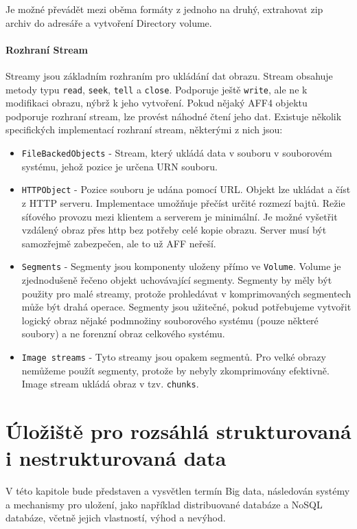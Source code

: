 \noindent Je možné převádět mezi oběma formáty z jednoho na druhý, extrahovat zip archiv do adresáře a vytvoření Directory volume.

\subsubsection{Rozhraní Stream}
Streamy jsou základním rozhraním pro ukládání dat obrazu. Stream obsahuje metody typu \texttt{read}, \texttt{seek}, \texttt{tell} a \texttt{close}. Podporuje ještě \texttt{write}, ale ne k modifikaci obrazu, nýbrž k jeho vytvoření. Pokud nějaký AFF4 objektu podporuje rozhraní stream, lze provést náhodné čtení jeho dat. Existuje několik specifických implementací rozhraní stream, některými z nich jsou:

\begin{itemize}
\item \texttt{FileBackedObjects} - Stream, který ukládá data v souboru v souborovém systému, jehož pozice je určena URN souboru.

\item \texttt{HTTPObject} - Pozice souboru je udána pomocí URL. Objekt lze ukládat a číst z HTTP serveru. Implementace umožňuje přečíst určité rozmezí bajtů. Režie síťového provozu mezi klientem a serverem je minimální. Je možné vyšetřit vzdálený obraz přes http bez potřeby celé kopie obrazu. Server musí být samozřejmě zabezpečen, ale to už AFF neřeší.

\item \texttt{Segments} - Segmenty jsou komponenty uloženy přímo ve \texttt{Volume}. Volume je zjednodušeně řečeno objekt uchovávající segmenty. Segmenty by měly být použity pro malé streamy, protože prohledávat v komprimovaných segmentech může být drahá operace. Segmenty jsou užitečné, pokud potřebujeme vytvořit logický obraz nějaké podmnožiny souborového systému (pouze některé soubory) a ne forenzní obraz celkového systému.

\item \texttt{Image streams} - Tyto streamy jsou opakem segmentů. Pro velké obrazy nemůžeme použít segmenty, protože by nebyly zkomprimovány efektivně. Image stream ukládá obraz v tzv. \texttt{chunks}.
\end{itemize}

\chapter{Úložiště pro rozsáhlá strukturovaná i nestrukturovaná data} \label{chapter2}
V této kapitole bude představen a vysvětlen termín Big data, následován systémy a mechanismy pro uložení, jako například distribuované databáze a NoSQL databáze, včetně jejich vlastností, výhod a nevýhod.

